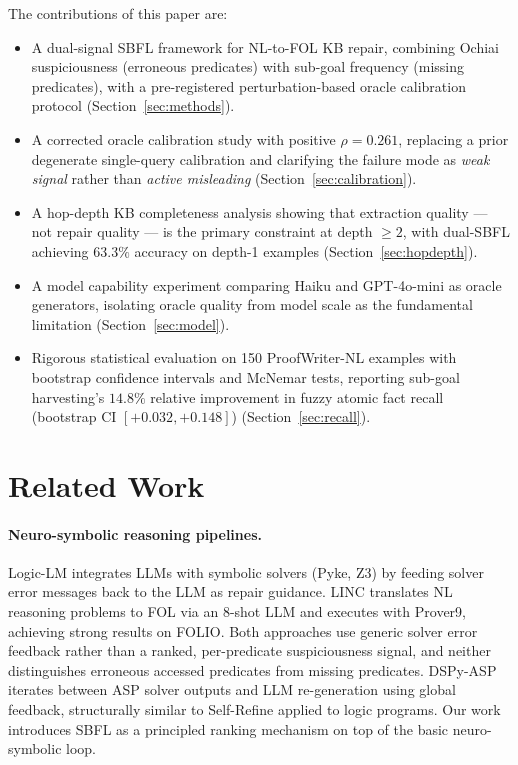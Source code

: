 \documentclass[11pt,letterpaper]{article}
\begin{document}
The contributions of this paper are:
\begin{itemize}
  \item A dual-signal SBFL framework for NL-to-FOL KB repair, combining Ochiai suspiciousness (erroneous predicates) with sub-goal frequency (missing predicates), with a pre-registered perturbation-based oracle calibration protocol (Section~\ref{sec:methods}).
  \item A corrected oracle calibration study with positive $\rho = 0.261$, replacing a prior degenerate single-query calibration and clarifying the failure mode as \emph{weak signal} rather than \emph{active misleading} (Section~\ref{sec:calibration}).
  \item A hop-depth KB completeness analysis showing that extraction quality — not repair quality — is the primary constraint at depth $\geq 2$, with dual-SBFL achieving $63.3\%$ accuracy on depth-1 examples (Section~\ref{sec:hopdepth}).
  \item A model capability experiment comparing Haiku and GPT-4o-mini as oracle generators, isolating oracle quality from model scale as the fundamental limitation (Section~\ref{sec:model}).
  \item Rigorous statistical evaluation on 150 ProofWriter-NL examples with bootstrap confidence intervals and McNemar tests, reporting sub-goal harvesting's $14.8\%$ relative improvement in fuzzy atomic fact recall (bootstrap CI $[+0.032, +0.148]$) (Section~\ref{sec:recall}).
\end{itemize}

\section{Related Work}

\paragraph{Neuro-symbolic reasoning pipelines.} Logic-LM \citep{Pan2023} integrates LLMs with symbolic solvers (Pyke, Z3) by feeding solver error messages back to the LLM as repair guidance. LINC \citep{Olausson2023} translates NL reasoning problems to FOL via an 8-shot LLM and executes with Prover9, achieving strong results on FOLIO. Both approaches use generic solver error feedback rather than a ranked, per-predicate suspiciousness signal, and neither distinguishes erroneous accessed predicates from missing predicates. DSPy-ASP \citep{Ishay2023} iterates between ASP solver outputs and LLM re-generation using global feedback, structurally similar to Self-Refine applied to logic programs. Our work introduces SBFL as a principled ranking mechanism on top of the basic neuro-symbolic loop.
\end{document}
